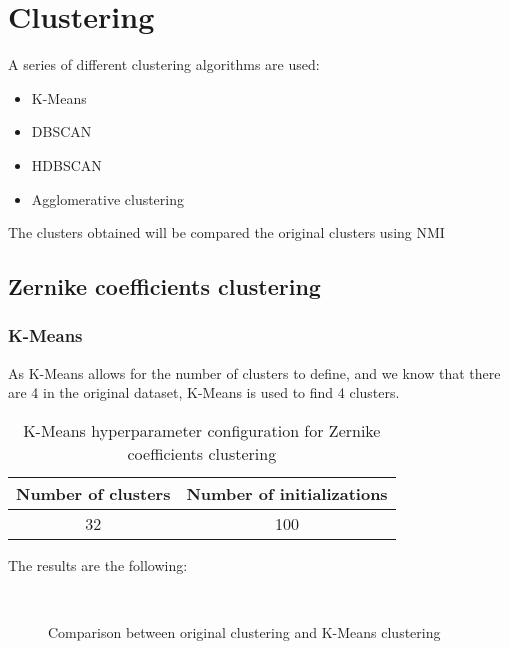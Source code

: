 \section{Clustering}
	
		
		A series of different clustering algorithms are used:
		\begin{itemize}
			\item K-Means
			\item DBSCAN
			\item HDBSCAN
			\item Agglomerative clustering
		\end{itemize}
		
		The clusters obtained will be compared the original clusters using NMI
		
	\subsection{Zernike coefficients clustering}
		
		\subsubsection{K-Means}
			
			As K-Means allows for the number of clusters to define, and we know that there are 4 in the original dataset, K-Means is used to find 4 clusters.
			
			\begin{table}[h!]
				\centering
				\begin{tabular}{|c|c|}
					\hline
					\textbf{Number of clusters} & \textbf{Number of initializations}\\
					\hline
					32 & 100\\
					\hline
				\end{tabular}
				\caption{K-Means hyperparameter configuration for Zernike coefficients clustering}
			\end{table}
		
			The results are the following:
			
			\begin{figure*}[ht!]
				\centering
				\hspace{\fill}
				\\
					
				\hspace{\fill}
				\caption{Comparison between original clustering and K-Means clustering}
			\end{figure*}
		\FloatBarrier
		
